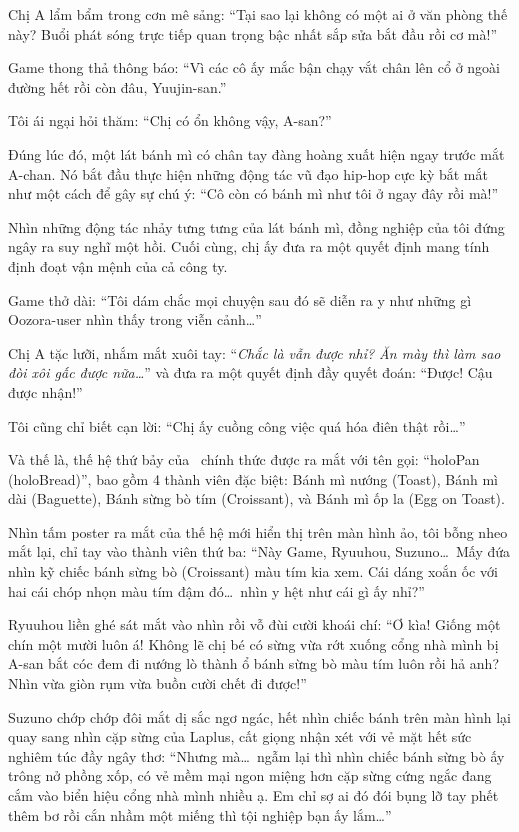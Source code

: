\documentclass[../main.tex]{subfiles}
\begin{document}

Chị A lẩm bẩm trong cơn mê sảng: ``Tại sao lại không có một ai ở văn phòng thế này? Buổi phát sóng trực tiếp quan trọng bậc nhất sắp sửa bắt đầu rồi cơ mà!''

Game thong thả thông báo: ``Vì các cô ấy mắc bận chạy vắt chân lên cổ ở ngoài đường hết rồi còn đâu, Yuujin-san.''

Tôi ái ngại hỏi thăm: ``Chị có ổn không vậy, A-san?''

Đúng lúc đó, một lát bánh mì có chân tay đàng hoàng xuất hiện ngay trước mắt A-chan. Nó bắt đầu thực hiện những động tác vũ đạo hip-hop cực kỳ bắt mắt như một cách để gây sự chú ý: ``Cô còn có bánh mì như tôi ở ngay đây rồi mà!''

Nhìn những động tác nhảy tưng tưng của lát bánh mì, đồng nghiệp của tôi đứng ngây ra suy nghĩ một hồi. Cuối cùng, chị ấy đưa ra một quyết định mang tính định đoạt vận mệnh của cả công ty.

Game thở dài: ``Tôi dám chắc mọi chuyện sau đó sẽ diễn ra y như những gì Oozora-user nhìn thấy trong viễn cảnh\dots''

Chị A tặc lưỡi, nhắm mắt xuôi tay: ``\textit{Chắc là vẫn được nhỉ? Ăn mày thì làm sao đòi xôi gấc được nữa\dots}'' và đưa ra một quyết định đầy quyết đoán: ``Được! Cậu được nhận!''

Tôi cũng chỉ biết cạn lời: ``Chị ấy cuồng công việc quá hóa điên thật rồi\dots''

Và thế là, thế hệ thứ bảy của \hll\ chính thức được ra mắt với tên gọi: ``holoPan (holoBread)'', bao gồm 4 thành viên đặc biệt: Bánh mì nướng (Toast), Bánh mì dài (Baguette), Bánh sừng bò tím (Croissant), và Bánh mì ốp la (Egg on Toast).


Nhìn tấm poster ra mắt của thế hệ mới hiển thị trên màn hình ảo, tôi bỗng nheo mắt lại, chỉ tay vào thành viên thứ ba: ``Này Game, Ryuuhou, Suzuno\dots\ Mấy đứa nhìn kỹ chiếc bánh sừng bò (Croissant) màu tím kia xem. Cái dáng xoắn ốc với hai cái chóp nhọn màu tím đậm đó\dots\ nhìn y hệt như cái gì ấy nhỉ?''

Ryuuhou liền ghé sát mắt vào nhìn rồi vỗ đùi cười khoái chí: ``Ơ kìa! Giống một chín một mười luôn á! Không lẽ chị bé có sừng vừa rớt xuống cổng nhà mình bị A-san bắt cóc đem đi nướng lò thành ổ bánh sừng bò màu tím luôn rồi hả anh? Nhìn vừa giòn rụm vừa buồn cười chết đi được!''

Suzuno chớp chớp đôi mắt dị sắc ngơ ngác, hết nhìn chiếc bánh trên màn hình lại quay sang nhìn cặp sừng của Laplus, cất giọng nhận xét với vẻ mặt hết sức nghiêm túc đầy ngây thơ: ``Nhưng mà\dots\ ngẫm lại thì nhìn chiếc bánh sừng bò ấy trông nở phồng xốp, có vẻ mềm mại ngon miệng hơn cặp sừng cứng ngắc đang cắm vào biển hiệu cổng nhà mình nhiều ạ. Em chỉ sợ ai đó đói bụng lỡ tay phết thêm bơ rồi cắn nhầm một miếng thì tội nghiệp bạn ấy lắm\dots''
\end{document}
